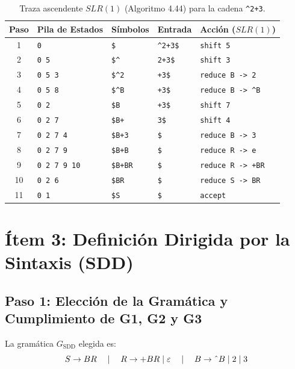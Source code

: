 \documentclass[11pt,a4paper]{article}
\begin{document}
\begin{table}[htbp]
\centering
\small
\begin{tabular}{@{}c|lllp{4.2cm}@{}}
\toprule
\textbf{Paso} & \textbf{Pila de Estados} & \textbf{S\'imbolos} & \textbf{Entrada} & \textbf{Acci\'on ($SLR(1)$)} \\
\midrule
1 & \texttt{0} & \texttt{\$} & \texttt{\^{}2+3\$} & \texttt{shift 5} \\
2 & \texttt{0 5} & \texttt{\$\^{}} & \texttt{2+3\$} & \texttt{shift 3} \\
3 & \texttt{0 5 3} & \texttt{\$\^{}2} & \texttt{+3\$} & \texttt{reduce B -> 2} \\
4 & \texttt{0 5 8} & \texttt{\$\^{}B} & \texttt{+3\$} & \texttt{reduce B -> \^{}B} \\
5 & \texttt{0 2} & \texttt{\$B} & \texttt{+3\$} & \texttt{shift 7} \\
6 & \texttt{0 2 7} & \texttt{\$B+} & \texttt{3\$} & \texttt{shift 4} \\
7 & \texttt{0 2 7 4} & \texttt{\$B+3} & \texttt{\$} & \texttt{reduce B -> 3} \\
8 & \texttt{0 2 7 9} & \texttt{\$B+B} & \texttt{\$} & \texttt{reduce R -> e} \\
9 & \texttt{0 2 7 9 10} & \texttt{\$B+BR} & \texttt{\$} & \texttt{reduce R -> +BR} \\
10 & \texttt{0 2 6} & \texttt{\$BR} & \texttt{\$} & \texttt{reduce S -> BR} \\
11 & \texttt{0 1} & \texttt{\$S} & \texttt{\$} & \texttt{accept} \\
\bottomrule
\end{tabular}
\caption{Traza ascendente $SLR(1)$ (Algoritmo 4.44) para la cadena \texttt{\^{}2+3}.}
\label{tab:trace_slr1}
\end{table}

\section{\'Item 3: Definici\'on Dirigida por la Sintaxis (SDD)}

\subsection{Paso 1: Elecci\'on de la Gram\'atica y Cumplimiento de G1, G2 y G3}
La gram\'atica $G_{\text{SDD}}$ elegida es:
\[
S \to B R \quad \mid \quad R \to + B R \mid \varepsilon \quad \mid \quad B \to \text{\^{}} B \mid 2 \mid 3
\]
\end{document}
